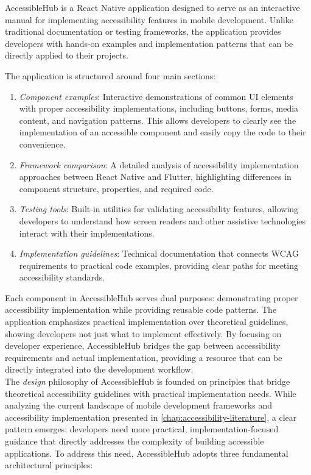 AccessibleHub is a React Native application designed to serve as an interactive manual for implementing accessibility features in mobile development. Unlike traditional documentation or testing frameworks, the application provides developers with hands-on examples and implementation patterns that can be directly applied to their projects.

The application is structured around four main sections:
\begin{enumerate}
    \item \textit{Component examples}: Interactive demonstrations of common UI elements with proper accessibility implementations, including buttons, forms, media content, and navigation patterns. This allows developers to clearly see the implementation of an accessible component and easily copy the code to their convenience.
    
    \item \textit{Framework comparison}: A detailed analysis of accessibility implementation approaches between React Native and Flutter, highlighting differences in component structure, properties, and required code.
    
    \item \textit{Testing tools}: Built-in utilities for validating accessibility features, allowing developers to understand how screen readers and other assistive technologies interact with their implementations.
    
    \item \textit{Implementation guidelines}: Technical documentation that connects WCAG requirements to practical code examples, providing clear paths for meeting accessibility standards.
\end{enumerate}

Each component in AccessibleHub serves dual purposes: demonstrating proper accessibility implementation while providing reusable code patterns. The application emphasizes practical implementation over theoretical guidelines, showing developers not just what to implement effectively. By focusing on developer experience, AccessibleHub bridges the gap between accessibility requirements and actual implementation, providing a resource that can be directly integrated into the development workflow. \\

The \textit{design} philosophy of AccessibleHub is founded on principles that bridge theoretical accessibility guidelines with practical implementation needs. While analyzing the current landscape of mobile development frameworks and accessibility implementation presented in \ref{chap:accessibility-literature}, a clear pattern emerges: developers need more practical, implementation-focused guidance that directly addresses the complexity of building accessible applications. To address this need, AccessibleHub adopts three fundamental architectural principles:


